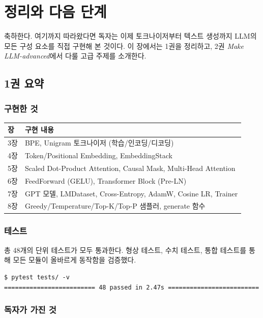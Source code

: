 \chapter{정리와 다음 단계}
\label{ch:wrapup}

축하한다. 여기까지 따라왔다면 독자는 이제 토크나이저부터 텍스트 생성까지 LLM의 모든 구성 요소를 직접 구현해 본 것이다. 이 장에서는 1권을 정리하고, 2권 \textit{Make LLM-advanced}에서 다룰 고급 주제를 소개한다.

\section{1권 요약}

\subsection{구현한 것}

\begin{center}
\begin{tabularx}{\textwidth}{lX}
\toprule
\textbf{장} & \textbf{구현 내용} \\
\midrule
3장 & BPE, Unigram 토크나이저 (학습/인코딩/디코딩) \\
4장 & Token/Positional Embedding, EmbeddingStack \\
5장 & Scaled Dot-Product Attention, Causal Mask, Multi-Head Attention \\
6장 & FeedForward (GELU), Transformer Block (Pre-LN) \\
7장 & GPT 모델, LMDataset, Cross-Entropy, AdamW, Cosine LR, Trainer \\
8장 & Greedy/Temperature/Top-K/Top-P 샘플러, generate 함수 \\
\bottomrule
\end{tabularx}
\end{center}

\subsection{테스트}

총 48개의 단위 테스트가 모두 통과한다. 형상 테스트, 수치 테스트, 통합 테스트를 통해 모든 모듈이 올바르게 동작함을 검증했다.

\begin{lstlisting}[style=bashstyle]
$ pytest tests/ -v
========================= 48 passed in 2.47s =========================
\end{lstlisting}

\subsection{독자가 가진 것}

